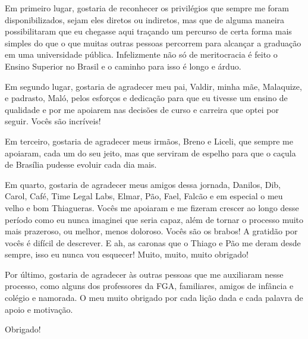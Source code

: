 \begin{agradecimentos}
  Em primeiro lugar, gostaria de reconhecer os privilégios que sempre me foram disponibilizados, sejam eles diretos ou indiretos, mas que de alguma maneira possibilitaram que eu chegasse aqui traçando um percurso de certa forma mais simples do que o que muitas outras pessoas percorrem para alcançar a graduação em uma universidade pública. Infelizmente não só de meritocracia é feito o Ensino Superior no Brasil e o caminho para isso é longo e árduo.

  Em segundo lugar, gostaria de agradecer meu pai, Valdir, minha mãe, Malaquize, e padrasto, Maló, pelos esforços e dedicação para que eu tivesse um ensino de qualidade e por me apoiarem nas decisões de curso e carreira que optei por seguir. Vocês são incríveis!

  Em terceiro, gostaria de agradecer meus irmãos, Breno e Liceli, que sempre me apoiaram, cada um do seu jeito, mas que serviram de espelho para que o caçula de Brasília pudesse evoluir cada dia mais.

  Em quarto, gostaria de agradecer meus amigos dessa jornada, Danilos, Dib, Carol, Café, Time Legal Labs, Elmar, Pão, Fael, Falcão e em especial o meu velho e bom  Thiagueras. Vocês me apoiaram e me fizeram crescer ao longo desse período como eu nunca imaginei que seria capaz, além de tornar o processo muito mais prazeroso, ou melhor, menos doloroso. Vocês são os brabos! A gratidão por vocês é difícil de descrever. E ah, as caronas que o Thiago e Pão me deram desde sempre, isso eu nunca vou esquecer! Muito, muito, muito obrigado!

  Por último, gostaria de agradecer às outras pessoas que me auxiliaram nesse processo, como alguns dos professores da FGA, familiares, amigos de infância e colégio e namorada. O meu muito obrigado por cada lição dada e cada palavra de apoio e motivação.

  Obrigado!

\end{agradecimentos}
